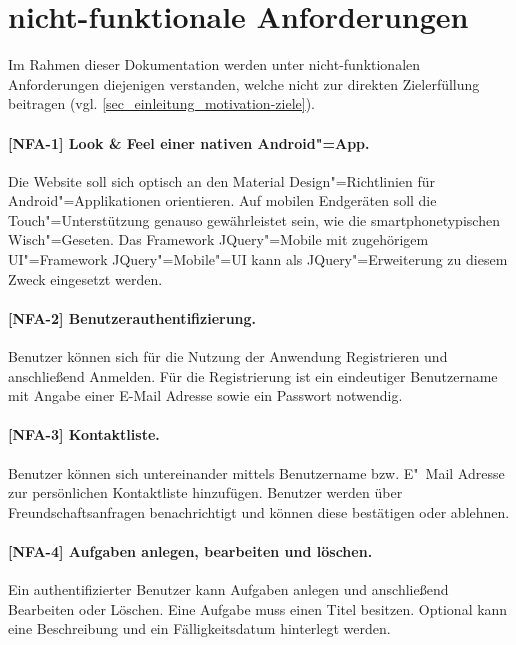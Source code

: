 \section{nicht-funktionale Anforderungen}
\label{sec_anforderungen_nicht-funktionale-anforderungen}

Im Rahmen dieser Dokumentation werden unter nicht-funktionalen Anforderungen diejenigen verstanden, welche nicht zur direkten Zielerfüllung beitragen (vgl. \ref{sec_einleitung_motivation-ziele}).


\paragraph{[NFA-1] Look \& Feel einer nativen Android"=App.} Die Website soll sich optisch an den \glqq Material Design\grqq "=Richtlinien für Android"=Applikationen orientieren. Auf mobilen Endgeräten soll die Touch"=Unterstützung genauso gewährleistet sein, wie die smartphonetypischen Wisch"=Geseten. Das Framework \glqq JQuery"=Mobile\grqq{} mit zugehörigem UI"=Framework \glqq JQuery"=Mobile"=UI\grqq{} kann als JQuery"=Erweiterung zu diesem Zweck eingesetzt werden.

\paragraph{[NFA-2] Benutzerauthentifizierung.} Benutzer können sich für die Nutzung der Anwendung Registrieren und anschließend Anmelden. Für die Registrierung ist ein eindeutiger Benutzername mit Angabe einer E-Mail Adresse sowie ein Passwort notwendig.

\paragraph{[NFA-3] Kontaktliste.} Benutzer können sich untereinander mittels Benutzername bzw. E"~Mail Adresse zur persönlichen Kontaktliste hinzufügen. Benutzer werden über Freundschaftsanfragen benachrichtigt und können diese bestätigen oder ablehnen.

\paragraph{[NFA-4] Aufgaben anlegen, bearbeiten und löschen.} Ein authentifizierter Benutzer kann Aufgaben anlegen und anschließend Bearbeiten oder Löschen. Eine Aufgabe muss einen Titel besitzen. Optional kann eine Beschreibung und ein Fälligkeitsdatum hinterlegt werden.

